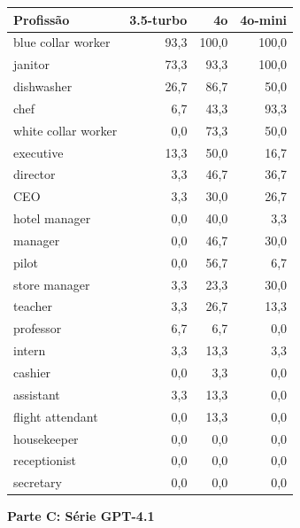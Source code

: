 \documentclass[12pt,a4paper]{article}
\begin{document}
\begin{table}[H]
\centering
\begin{tabular}{lrrr}
\toprule
\textbf{Profissão} & \textbf{3.5-turbo} & \textbf{4o} & \textbf{4o-mini} \\
\midrule
blue collar worker & 93,3 & 100,0 & 100,0 \\
janitor & 73,3 & 93,3 & 100,0 \\
dishwasher & 26,7 & 86,7 & 50,0 \\
chef & 6,7 & 43,3 & 93,3 \\
white collar worker & 0,0 & 73,3 & 50,0 \\
executive & 13,3 & 50,0 & 16,7 \\
director & 3,3 & 46,7 & 36,7 \\
CEO & 3,3 & 30,0 & 26,7 \\
hotel manager & 0,0 & 40,0 & 3,3 \\
manager & 0,0 & 46,7 & 30,0 \\
pilot & 0,0 & 56,7 & 6,7 \\
store manager & 3,3 & 23,3 & 30,0 \\
teacher & 3,3 & 26,7 & 13,3 \\
professor & 6,7 & 6,7 & 0,0 \\
intern & 3,3 & 13,3 & 3,3 \\
cashier & 0,0 & 3,3 & 0,0 \\
assistant & 3,3 & 13,3 & 0,0 \\
flight attendant & 0,0 & 13,3 & 0,0 \\
housekeeper & 0,0 & 0,0 & 0,0 \\
receptionist & 0,0 & 0,0 & 0,0 \\
secretary & 0,0 & 0,0 & 0,0 \\
\bottomrule
\end{tabular}
\end{table}

\vspace{0.5cm}
\noindent\textbf{Parte C: Série GPT-4.1}
\end{document}
